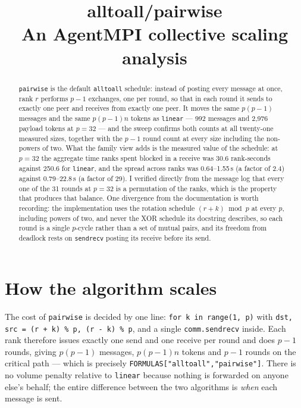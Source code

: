 \documentclass[11pt]{article}
\title{\textbf{alltoall/pairwise}\\[2pt]\large An AgentMPI collective scaling analysis}
\author{}
\date{}
\begin{document}
\maketitle

\begin{abstract}
\texttt{pairwise} is the default \texttt{alltoall} schedule: instead of posting every message
at once, rank $r$ performs $p-1$ exchanges, one per round, so that in each round it sends to
exactly one peer and receives from exactly one peer. It moves the same $p(p-1)$ messages and
the same $p(p-1)n$ tokens as \texttt{linear} --- 992 messages and 2,976 payload tokens at
$p=32$ --- and the sweep confirms both counts at all twenty-one measured sizes, together with
the $p-1$ round count at every size including the non-powers of two. What the family view adds
is the measured value of the schedule: at $p=32$ the aggregate time ranks spent blocked in a
receive was 30.6 rank-seconds against 250.6 for \texttt{linear}, and the spread across ranks
was 0.64--1.55\,s (a factor of 2.4) against 0.79--22.8\,s (a factor of 29). I verified directly
from the message log that every one of the 31 rounds at $p=32$ is a permutation of the ranks,
which is the property that produces that balance. One divergence from the documentation is
worth recording: the implementation uses the rotation schedule $(r+k) \bmod p$ at every $p$,
including powers of two, and never the XOR schedule its docstring describes, so each round is a
single $p$-cycle rather than a set of mutual pairs, and its freedom from deadlock rests on
\texttt{sendrecv} posting its receive before its send.
\end{abstract}



\section{How the algorithm scales}

The cost of \texttt{pairwise} is decided by one line: \texttt{for k in range(1, p)} with
\texttt{dst, src = (r + k) \% p, (r - k) \% p}, and a single \texttt{comm.sendrecv} inside. Each
rank therefore issues exactly one send and one receive per round and does $p-1$ rounds, giving
$p(p-1)$ messages, $p(p-1)n$ tokens and $p-1$ rounds on the critical path --- which is
precisely \texttt{FORMULAS["alltoall","pairwise"]}. There is no volume penalty relative to
\texttt{linear} because nothing is forwarded on anyone else's behalf; the entire difference
between the two algorithms is \emph{when} each message is sent.
\end{document}

